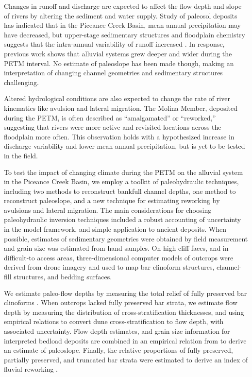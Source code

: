 \documentclass[draft]{compact_proposal}
\begin{document}
Changes in runoff and discharge are expected to affect the flow depth and slope of rivers by altering the sediment and water supply.
Study of paleosol deposits has indicated that in the Piceance Creek Basin, mean annual precipitation may have decreased, but upper-stage sedimentary structures \cnote and floodplain chemistry \cnote suggests that the intra-annual variability of runoff increased \cnote.
In response, previous work shows that alluvial systems grew deeper and wider during the PETM interval.
No estimate of paleoslope has been made though, making an interpretation of changing channel geometries and sedimentary structures challenging.

Altered hydrological conditions are also expected to change the rate of river kinematics like avulsion and lateral migration.
The Molina Member, deposited during the PETM, is often described as ``amalgamated'' or ``reworked,'' \cnote suggesting that rivers were more active and revisited locations across the floodplain more often.
This observation holds with a hypothesized increase in discharge variability and lower mean annual precipitation, but is yet to be tested in the field.

To test the impact of changing climate during the PETM on the alluvial system in the Piceance Creek Basin, we employ a toolkit of paleohydraulic techniques, including two methods to reconstruct bankfull channel depths, one method to reconstruct paleoslope, and a new technique for estimating reworking by avulsions and lateral migration.
The main considerations for choosing paleohydraulic inversion techniques included a robust accounting of uncertainty in the model framework, and simple application to ancient deposits.
When possible, estimates of sedimentary geometries were obtained by field measurement and grain size was estimated from hand samples.
On high cliff faces, and in difficult-to access areas, three-dimensional computer models of outcrops were derived from drone imagery and used to map bar clinoform structures, channel-fill structures, and bedding surfaces.

We estimate paleo-flow depths by measuring the total relief of fully preserved bar clinoforms .
When outcrops lacked fully preserved bar strata, we estimate flow depth by measuring the distribution of cross-stratification thicknesses, and using empirical relations to convert dune cross-stratification to flow depth, with associated uncertainty.
Flow depth estimates, and grain size information for interpreted bedload deposits are combined in an empirical relation from \cnote[trampush] to derive an estimate of paleoslope.
Finally, the relative proportions of fully-preserved, partially preserved, and truncated bar strata were estimated to derive an index of fluvial reworking \cnote.
\end{document}
